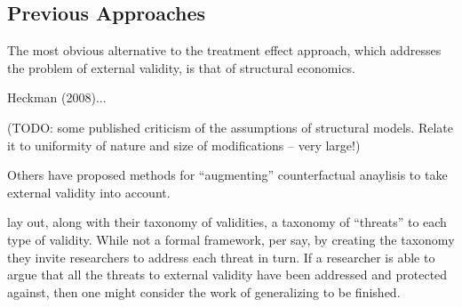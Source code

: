 \documentclass[a4paper,12pt]{article}
\begin{document}

\subsection*{Previous Approaches}

The most obvious alternative to the treatment effect approach, which addresses the problem of external validity, is that of structural economics.


Heckman (2008)...

(TODO: some published criticism of the assumptions of structural models. Relate it to uniformity of nature and size of modifications -- very large!)

Others have proposed methods for ``augmenting'' counterfactual anaylisis to take external validity into account. 

\cite{Shadish2002} lay out, along with their taxonomy of validities, a taxonomy of ``threats'' to each type of validity. While not a formal framework, per say, by creating the taxonomy they invite researchers to address each threat in turn. If a researcher is able to argue that all the threats to external validity have been addressed and protected against, then one might consider the work of generalizing to be finished. 
\end{document}
